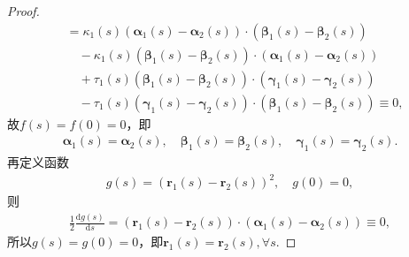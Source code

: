\documentclass[../../main.tex]{subfiles}%
\begin{document}
\begin{proof}
\begin{align*}
&= \kappa_1(s)(\bm{\alpha}_1(s) - \bm{\alpha}_2(s)) \cdot (\bm{\beta}_1(s) - \bm{\beta}_2(s)) \\
&\quad - \kappa_1(s)(\bm{\beta}_1(s) - \bm{\beta}_2(s)) \cdot (\bm{\alpha}_1(s) - \bm{\alpha}_2(s)) \\
&\quad + \tau_1(s)(\bm{\beta}_1(s) - \bm{\beta}_2(s)) \cdot (\bm{\gamma}_1(s) - \bm{\gamma}_2(s)) \\
&\quad - \tau_1(s)(\bm{\gamma}_1(s) - \bm{\gamma}_2(s)) \cdot (\bm{\beta}_1(s) - \bm{\beta}_2(s)) \equiv 0,
\end{align*}
故$f(s) = f(0) = 0$，即
\begin{align}
\bm{\alpha}_1(s) = \bm{\alpha}_2(s),\quad \bm{\beta}_1(s) = \bm{\beta}_2(s),\quad \bm{\gamma}_1(s) = \bm{\gamma}_2(s).
\label{eq:--3ur0jfdjgijiL:LIHFIOAWHFNASawf5.2}
\end{align}
再定义函数
\begin{align}
g(s) = (\bm{r}_1(s) - \bm{r}_2(s))^2,\quad g(0) = 0,
\label{eq:--3ur0jfdjgijiL:LIHFIOAWHFNASawf5.3}
\end{align}
则
\begin{align*}
\frac{1}{2}\frac{\mathrm{d}g(s)}{\mathrm{d}s} = (\bm{r}_1(s) - \bm{r}_2(s)) \cdot (\bm{\alpha}_1(s) - \bm{\alpha}_2(s)) \equiv 0,
\end{align*}
所以$g(s) = g(0) = 0$，即$\bm{r}_1(s) = \bm{r}_2(s),\forall s$.
\end{proof}
\end{document}
